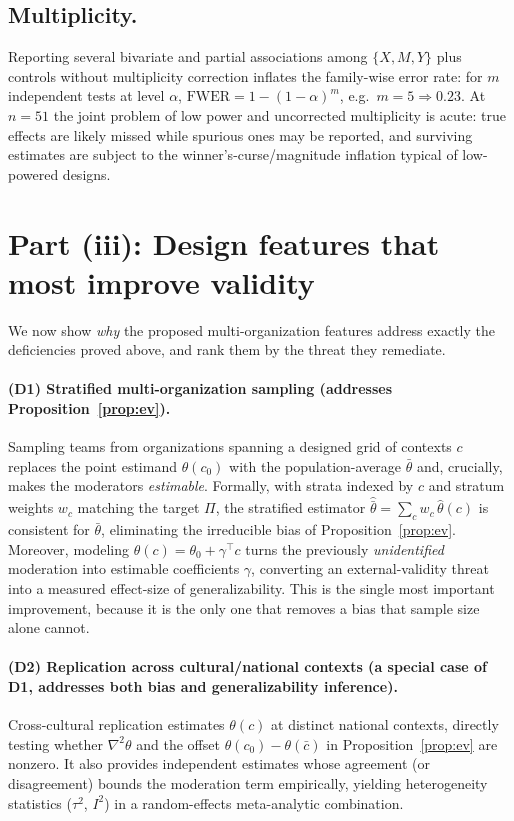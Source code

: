 \documentclass{amsart}
\theoremstyle{definition}
\begin{document}
\subsection*{Multiplicity.}
Reporting several bivariate and partial associations among $\{X,M,Y\}$ plus
controls without multiplicity correction inflates the family-wise error rate:
for $m$ independent tests at level $\alpha$, $\mathrm{FWER}=1-(1-\alpha)^m$,
e.g.\ $m=5\Rightarrow 0.23$. At $n=51$ the joint problem of low power and
uncorrected multiplicity is acute: true effects are likely missed while
spurious ones may be reported, and surviving estimates are subject to the
winner's-curse/magnitude inflation typical of low-powered designs.

\section*{Part (iii): Design features that most improve validity}

We now show \emph{why} the proposed multi-organization features address
exactly the deficiencies proved above, and rank them by the threat they
remediate.

\paragraph{(D1) Stratified multi-organization sampling (addresses
Proposition~\ref{prop:ev}).}
Sampling teams from organizations spanning a designed grid of contexts
$c$ replaces the point estimand $\theta(c_0)$ with the population-average
$\bar\theta$ and, crucially, makes the moderators \emph{estimable}.
Formally, with strata indexed by $c$ and stratum weights $w_c$ matching the
target $\Pi$, the stratified estimator
$\widehat{\bar\theta}=\sum_c w_c\,\widehat\theta(c)$ is consistent for
$\bar\theta$, eliminating the irreducible bias of
Proposition~\ref{prop:ev}. Moreover, modeling $\theta(c)=\theta_0+\gamma^\top c$
turns the previously \emph{unidentified} moderation into estimable
coefficients $\gamma$, converting an external-validity threat into a
measured effect-size of generalizability. This is the single most important
improvement, because it is the only one that removes a bias that sample size
alone cannot.

\paragraph{(D2) Replication across cultural/national contexts (a special
case of D1, addresses both bias and generalizability inference).}
Cross-cultural replication estimates $\theta(c)$ at distinct national
contexts, directly testing whether
$\nabla^2\theta$ and the offset $\theta(c_0)-\theta(\bar c)$ in
Proposition~\ref{prop:ev} are nonzero. It also provides independent estimates
whose agreement (or disagreement) bounds the moderation term empirically,
yielding heterogeneity statistics ($\tau^2$, $I^2$) in a random-effects
meta-analytic combination.
\end{document}
